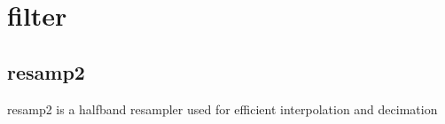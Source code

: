 \section{filter}

\subsection{resamp2}
resamp2 is a halfband resampler used for efficient interpolation and
decimation
